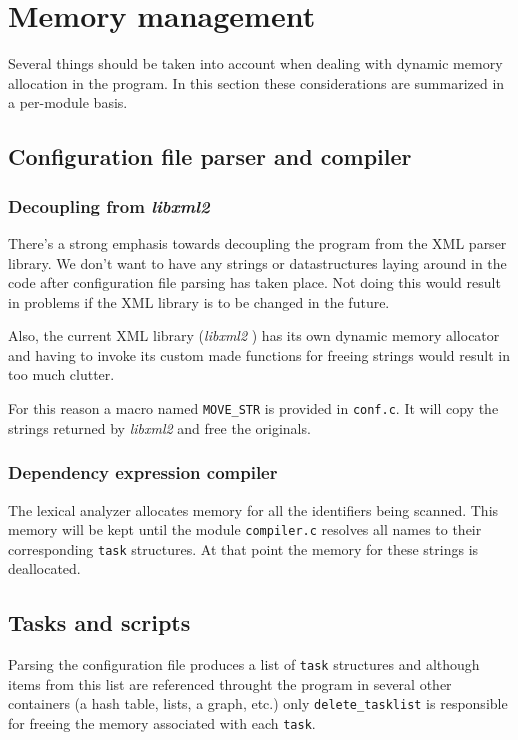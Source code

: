 \documentclass[a4paper,12pt]{book}
\newcommand{\libxml}{\emph{libxml2} }
\newcommand{\code}[1]{\texttt{#1}}
\begin{document}
\chapter{Memory management}

Several things should be taken into account when dealing with dynamic memory
allocation in the program. In this section these considerations are summarized
in a per-module basis.

\section{Configuration file parser and compiler}

\subsection{Decoupling from \libxml}

There's a strong emphasis towards decoupling the program from the XML parser
library.  We don't want to have any strings or datastructures laying around in
the code after configuration file parsing has taken place. Not doing this would
result in problems if the XML library is to be changed in the future.

Also, the current XML library (\libxml) has its own dynamic memory
allocator and having to invoke its custom made functions for freeing strings
would result in too much clutter.

For this reason a macro named \code{MOVE\_STR} is provided in \code{conf.c}. It
will copy the strings returned by \libxml and free the originals.

\subsection{Dependency expression compiler}

The lexical analyzer allocates memory for all the identifiers being scanned.
This memory will be kept until the module \code{compiler.c} resolves all names
to their corresponding \code{task} structures. At that point the memory for
these strings is deallocated.

\section{Tasks and scripts}

Parsing the configuration file produces a list of \code{task} structures and
although items from this list are referenced throught the program in several
other containers (a hash table, lists, a graph, etc.) only
\code{delete\_tasklist} is responsible for freeing the memory associated with
each \code{task}.
\end{document}
